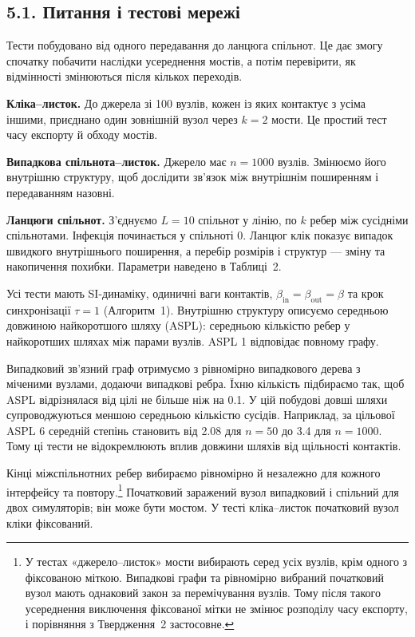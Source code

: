 \documentclass[11pt,a4paper]{article}
\begin{document}
\subsection*{5.1. Питання і тестові мережі}
Тести побудовано від одного передавання до ланцюга спільнот. Це дає змогу спочатку побачити наслідки усереднення мостів, а потім перевірити, як відмінності змінюються після кількох переходів.
\par \textbf{Кліка--листок.} До джерела зі 100 вузлів, кожен із яких контактує з усіма іншими, приєднано один зовнішній вузол через $k=2$ мости. Це простий тест часу експорту й обходу мостів.
\par \textbf{Випадкова спільнота--листок.} Джерело має $n=1000$ вузлів. Змінюємо його внутрішню структуру, щоб дослідити зв'язок між внутрішнім поширенням і передаванням назовні.
\par \textbf{Ланцюги спільнот.} З'єднуємо $L=10$ спільнот у лінію, по $k$ ребер між сусідніми спільнотами. Інфекція починається у спільноті 0. Ланцюг клік показує випадок швидкого внутрішнього поширення, а перебір розмірів і структур --- зміну та накопичення похибки. Параметри наведено в Таблиці~2.
\par Усі тести мають SI-динаміку, одиничні ваги контактів, $\beta_{\mathrm{in}}=\beta_{\mathrm{out}}=\beta$ та крок синхронізації $\tau=1$ (Алгоритм~1). Внутрішню структуру описуємо середньою довжиною найкоротшого шляху (ASPL): середньою кількістю ребер у найкоротших шляхах між парами вузлів. ASPL 1 відповідає повному графу.
\par Випадковий зв'язний граф отримуємо з рівномірно випадкового дерева з міченими вузлами, додаючи випадкові ребра. Їхню кількість підбираємо так, щоб ASPL відрізнялася від цілі не більше ніж на 0.1. У цій побудові довші шляхи супроводжуються меншою середньою кількістю сусідів. Наприклад, за цільової ASPL 6 середній степінь становить від 2.08 для $n=50$ до 3.4 для $n=1000$. Тому ці тести не відокремлюють вплив довжини шляхів від щільності контактів.
\par Кінці міжспільнотних ребер вибираємо рівномірно й незалежно для кожного інтерфейсу та повтору.\footnote{У тестах «джерело--листок» мости вибирають серед усіх вузлів, крім одного з фіксованою міткою. Випадкові графи та рівномірно вибраний початковий вузол мають однаковий закон за перемічування вузлів. Тому після такого усереднення виключення фіксованої мітки не змінює розподілу часу експорту, і порівняння з Твердження~2 застосовне.} Початковий заражений вузол випадковий і спільний для двох симуляторів; він може бути мостом. У тесті кліка--листок початковий вузол кліки фіксований.
\end{document}

